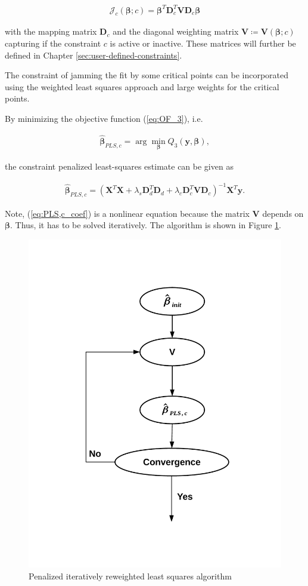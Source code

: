 \documentclass[10pt,a4paper]{article}
\begin{document}
	\begin{align} \label{eq:mapping_matrix}
		\mathcal{J}_c(\boldsymbol{\beta}; c) = \boldsymbol{\beta}^T \boldsymbol{D}_c^T \boldsymbol{V} \boldsymbol{D}_c  \boldsymbol{\beta}
	\end{align}

	with the mapping matrix $\boldsymbol{D}_c$ and the diagonal weighting matrix $\boldsymbol{V} \coloneqq \boldsymbol{V}(\boldsymbol{\beta}; c)$ capturing if the constraint $c$ is active or inactive. These matrices will further be defined in Chapter \ref{sec:user-defined-constraints}.
	
	The constraint of jamming the fit by some critical points can be incorporated using the weighted least squares approach and large weights for the critical points. \cite{strutz2016data}
	
	By minimizing the objective function (\ref{eq:OF_3}), i.e.
	
	\begin{align}\label{eq:optimization_problem_3}
		\boldsymbol{\hat \beta}_{PLS, c} = \arg \min_{\boldsymbol{\beta}} Q_3(\boldsymbol{y}, \boldsymbol{\beta}),
	\end{align}
	
	the constraint penalized least-squares estimate can be given as
	
	\begin{align} \label{eq:PLS,c_coef}
		\boldsymbol{\hat \beta}_{PLS, c} = (\boldsymbol{X}^T \boldsymbol{X} + \lambda_s \boldsymbol{D}_d^T \boldsymbol{D}_d + \lambda_c \boldsymbol{D}^T_c \boldsymbol{V} \boldsymbol{D}_c)^{-1} \boldsymbol{X}^T \boldsymbol{y}.
	\end{align}	
 
 	Note, (\ref{eq:PLS,c_coef}) is a nonlinear equation because the matrix $\boldsymbol{V}$ depends on $\boldsymbol{\beta}$. Thus, it has to be solved iteratively. The algorithm is shown in Figure \ref{fig:pirls}. 
 	
 	\begin{figure}[H]
 		\centering
 		\includegraphics[width=0.6\linewidth]{../thesisplots/algorithm.pdf}
 		\caption{Penalized iteratively reweighted least squares algorithm}
 		\label{fig:pirls}
 	\end{figure}
 	  
\end{document}
